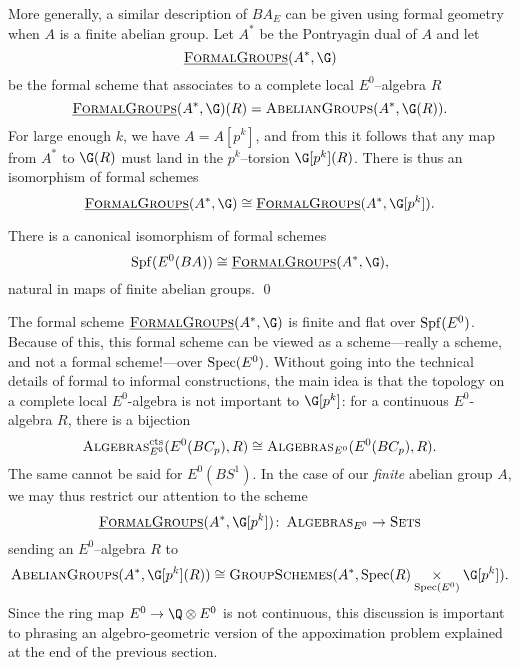 
More generally, a similar description of \(BA_{E}\) can be given using formal geometry when \(A\) is a finite abelian group. Let \(A^*\) be the Pontryagin dual of \(A\) and let
\[
\InternalHom{FormalGroups}(A^*, \G)
\]
be the formal scheme that associates to a complete local \(E^0\)--algebra \(R\)
\[
\InternalHom{FormalGroups}(A^*, \G)(R) = \CatOf{AbelianGroups}(A^*, \G(R)).
\]
For large enough \(k\), we have \(A = A[p^k]\), and from this it follows that any map from \(A^*\) to \(\G(R)\) must land in the \(p^k\)--torsion \(\G[p^k](R)\).  There is thus an isomorphism of formal schemes
\[
\InternalHom{FormalGroups}(A^*, \G) \cong \InternalHom{FormalGroups}(A^*, \G[p^k]).
\]
\begin{proposition} \label{app:abeliangroupdualhom}
There is a canonical isomorphism of formal schemes
\[
\Spf(E^0(BA)) \cong \InternalHom{FormalGroups}(A^*, \G),
\]
natural in maps of finite abelian groups. \qed
\end{proposition}


The formal scheme \(\InternalHom{FormalGroups}(A^*,\G)\) is finite and flat over \(\operatorname{Spf}(E^0)\). Because of this, this formal scheme can be viewed as a scheme---really a scheme, and not a formal scheme!---over \(\operatorname{Spec}(E^0)\). Without going into the technical details of formal to informal constructions, the main idea is that the topology on a complete local \(E^0\)-algebra is not important to \(\G[p^k]\): for a continuous \(E^0\)-algebra \(R\), there is a bijection
\[
\normalfont\textsc{Algebras}_{E^0}^{\mathrm{cts}}(E^0(BC_p),R) \cong \normalfont\textsc{Algebras}_{E^0}(E^0(BC_p),R).
\]
The same cannot be said for \(E^0(BS^1)\).  In the case of our \emph{finite} abelian group $A$, we may thus restrict our attention to the scheme
\[
\InternalHom{FormalGroups}(A^*,\G[p^k]) \co \CatOf{Algebras}_{E^0} \rightarrow \CatOf{Sets}
\]
sending an \(E^0\)--algebra \(R\) to
\[
\CatOf{AbelianGroups}(A^*, \G[p^k](R)) \cong \CatOf{GroupSchemes}(A^*, \Spec(R) \underset{{\Spec(E^0)}}{\times} \G[p^k]).
\]
Since the ring map \(E^0 \rightarrow \Q \otimes E^0\) is not continuous, this discussion is important to phrasing an algebro-geometric version of the appoximation problem explained at the end of the previous section.

